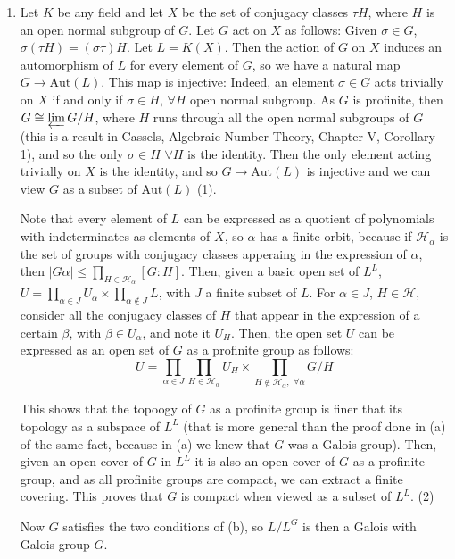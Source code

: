 \begin{sol}
\begin{enumerate}[label=\alph*)]
		\item Let $K$ be any field and let $X$ be the set of conjugacy classes $\tau H$, where $H$ is an open normal subgroup of $G$. Let $G$ act on $X$ as follows: Given $\sigma \in G$, $\sigma(\tau H) = (\sigma \tau)H$. Let $L = K(X)$. Then the action of $G$ on $X$ induces an automorphism of $L$ for every element of $G$, so we have a natural map $G \to \mathrm{Aut}(L)$. This map is injective: Indeed, an element $\sigma \in G$ acts trivially on $X$ if and only if $\sigma \in H$, $\forall H$ open normal subgroup. As $G$ is profinite, then $G \cong \varprojlim G/H$, where $H$ runs through all the open normal subgroups of $G$ (this is a result in Cassels, Algebraic Number Theory, Chapter V, Corollary 1), and so the only $\sigma \in H \, \, \forall H$ is the identity. Then the only element acting trivially on $X$ is the identity, and so $G \to \mathrm{Aut}(L)$ is injective and we can view $G$ as a subset of $\mathrm{Aut}(L)$ (1).

		Note that every element of $L$ can be expressed as a quotient of polynomials with indeterminates as elements of $X$, so $\alpha$ has a finite orbit, because if $\mathcal{H}_{\alpha}$ is the set of groups with conjugacy classes apperaing in the expression of $\alpha$, then $|G\alpha| \leq \prod_{H \in \mathcal{H}_\alpha}[G:H]$. Then, given a basic open set of $L^L$, $U = \prod_{\alpha \in J} U_\alpha \times \prod_{\alpha \notin J} L$, with $J$ a finite subset of $L$. For $\alpha \in J$, $H \in \mathcal{H}$, consider all the conjugacy classes of $H$ that appear in the expression of a certain $\beta$, with $\beta \in U_\alpha$, and note it $U_H$. Then, the open set $U$ can be expressed as an open set of $G$ as a profinite group as follows:
		\[
			U = \prod_{\alpha \in J} \prod_{H \in \mathcal{H}_\alpha} U_H \times \prod_{H \notin \mathcal{H}_{\alpha}, \, \, \forall \alpha} G/H
		\]

		This shows that the topoogy of $G$ as a profinite group is finer that its topology as a subspace of $L^L$ (that is more general than the proof done in (a) of the same fact, because in (a) we knew that $G$ was a Galois group). Then, given an open cover of $G$ in $L^L$ it is also an open cover of $G$ as a profinite group, and as all profinite groups are compact, we can extract a finite covering. This proves that $G$ is compact when viewed as a subset of $L^L$. (2)

		Now $G$ satisfies the two conditions of (b), so $L/L^G$ is then a Galois with Galois group $G$.

	\end{enumerate}
\end{sol}


